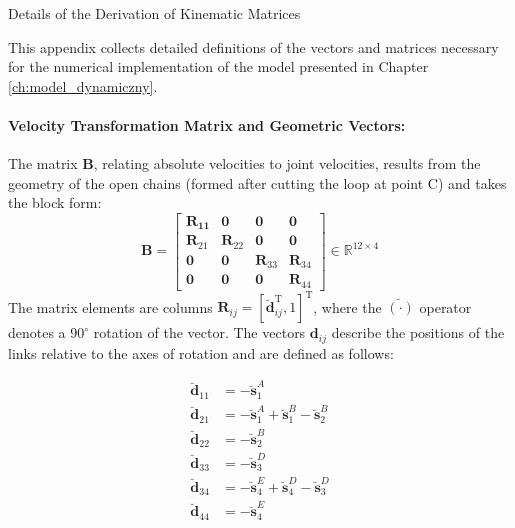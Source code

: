 \begin{easyappendix}{Details of the Derivation of Kinematic Matrices}
\label{app:szczegoly_kinematyczne}

This appendix collects detailed definitions of the vectors and matrices necessary for the numerical implementation of the model presented in Chapter \ref{ch:model_dynamiczny}.

\paragraph{Velocity Transformation Matrix and Geometric Vectors:}

The matrix $\mathbf{B}$, relating absolute velocities to joint velocities, results from the geometry of the open chains (formed after cutting the loop at point C) and takes the block form:
\begin{equation}
    \mathbf{B} = \begin{bmatrix}
        \boldsymbol{R_{11}} & \boldsymbol{0} &\boldsymbol{0} &\boldsymbol{0}\\
        \boldsymbol{R}_{21} & \boldsymbol{R}_{22} & \boldsymbol{0} & \boldsymbol{0}\\ 
        \boldsymbol{0} & \boldsymbol{0}&\boldsymbol{R}_{33}&\boldsymbol{R}_{34}\\
        \boldsymbol{0} & \boldsymbol{0} & \boldsymbol{0} & \boldsymbol{R}_{44}
     \end{bmatrix} \in \mathbb{R}^{12 \times 4}
\end{equation}
The matrix elements are columns $\boldsymbol{R}_{ij} = [\boldsymbol{\breve d}_{ij}^\mathrm{T}, 1]^\mathrm{T}$, where the $\breve{(\cdot)}$ operator denotes a $90^\circ$ rotation of the vector. The vectors $\boldsymbol{d}_{ij}$ describe the positions of the links relative to the axes of rotation and are defined as follows:

\begin{align}
    \boldsymbol{\breve d}_{11} &= -\boldsymbol{\breve s}_1^A \nonumber \\
    \boldsymbol{\breve d}_{21} &= -\boldsymbol{\breve s}_1^A+\boldsymbol{\breve s}_1^B-\boldsymbol{\breve s}_2^B \nonumber \\
    \boldsymbol{\breve d}_{22} &= -\boldsymbol{\breve s}_2^B \label{eq:app_vectors_d}\\
    \boldsymbol{\breve d}_{33} &= -\boldsymbol{\breve s}_3^D \nonumber \\
    \boldsymbol{\breve d}_{34} &= -\boldsymbol{\breve s}_4^E+\boldsymbol{\breve s}_4^D-\boldsymbol{\breve s}_3^D \nonumber \\
    \boldsymbol{\breve d}_{44} &= -\boldsymbol{\breve s}_4^E \nonumber
\end{align}


\end{easyappendix}
